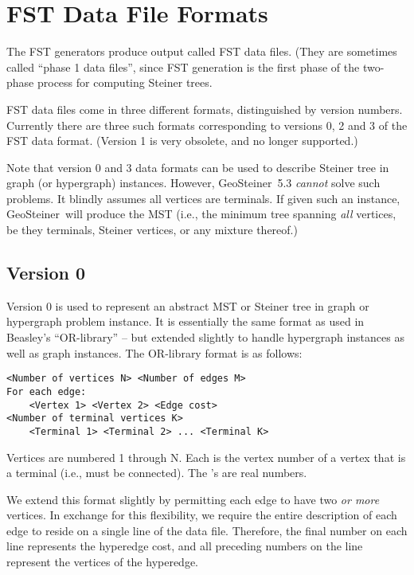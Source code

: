 \documentclass[12pt,twoside,letterpaper]{article}
\def\code#1{{\ttfamily #1}}
\def\geosteiner{Geo\-Steiner}
\newcommand{\GeoSteinerCurrentVersion}{5.3}
\begin{document}



\section{FST Data File Formats}
\label{sec:fst_formats}

The FST generators produce output called FST data files.  (They are
sometimes called ``phase 1 data files'', since FST generation is the first
phase of the two-phase process for computing Steiner trees.

FST data files come in three different formats, distinguished by version
numbers.  Currently there are three such formats corresponding to
versions 0, 2 and 3 of the FST data format.  (Version 1 is very
obsolete, and no longer supported.)

Note that version 0 and 3 data formats can be used to describe Steiner
tree in graph (or hypergraph) instances.  However,
\geosteiner~\GeoSteinerCurrentVersion{}
{\em cannot} solve such problems. It blindly assumes all vertices are
terminals.  If given such an instance, \geosteiner\ will produce the MST
(i.e., the minimum tree spanning {\em all} vertices, be they terminals,
Steiner vertices, or any mixture thereof.)

\subsection*{Version 0}

Version 0 is used to represent an abstract MST or Steiner tree in graph
or hypergraph problem instance.  It is essentially the same format as
used in Beasley's ``OR-library'' -- but extended slightly to handle
hypergraph instances as well as graph instances.  The OR-library format
is as follows:

{\footnotesize
\begin{verbatim}
<Number of vertices N> <Number of edges M>
For each edge:
    <Vertex 1> <Vertex 2> <Edge cost>
<Number of terminal vertices K>
    <Terminal 1> <Terminal 2> ... <Terminal K>
\end{verbatim}
}

Vertices are numbered 1 through N.  Each \code{<Terminal i>} is the vertex
number of a vertex that is a terminal (i.e., must be connected).
The \code{<Edge cost>}'s are real numbers.

We extend this format slightly by permitting each edge to have two
{\em or more} vertices.  In exchange for this flexibility, we require the entire
description of each edge to reside on a single line of the data file.
Therefore, the final number on each line represents the hyperedge cost,
and all preceding numbers on the line represent the vertices of the
hyperedge.
\end{document}
